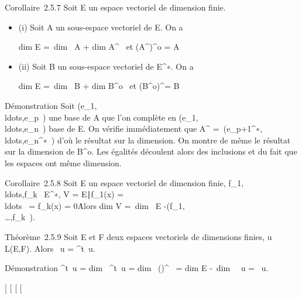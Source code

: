 \documentclass[]{article}
\begin{document}
Corollaire~2.5.7 Soit E un espace vectoriel de dimension finie.

\begin{itemize}
\item
  (i) Soit A un sous-espace vectoriel de E. On a

  dim E =\ dim~ A
  + dim A^\bot~\text
  et (A^\bot)^o = A
\item
  (ii) Soit B un sous-espace vectoriel de E^∗. On a

  dim E =\ dim~ B
  + dim B^o~\text
  et (B^o)^\bot = B
\end{itemize}

Démonstration Soit
(e_1,\\ldots,e_p~)
une base de A que l'on complète en
(e_1,\\ldots,e_n~)
base de E. On vérifie immédiatement que A^\bot
=\
\mathrmVect(e_p+1^∗,\\ldots,e_n^∗~)
d'où le résultat sur la dimension. On montre de même le résultat sur la
dimension de B^o. Les égalités découlent alors des inclusions
et du fait que les espaces ont même dimension.

Corollaire~2.5.8 Soit E un espace vectoriel de dimension finie,
f_1,\\ldots,f_k~
\in E^∗, V = \x \in
E∣f_1(x) =
\\ldots~ =
f_k(x) = 0\. Alors
dim V =\ dim~ E
-\mathrmrg(f_1,\\\ldots,f_k~).

Théorème~2.5.9 Soit E et F deux espaces vectoriels de dimensions finies,
u \in L(E,F). Alors
\mathrmrg~u
= \mathrmrg^t~u.

Démonstration
\mathrmrg^t~u
= dim~
\mathrmIm^t~u
= dim~
(\mathrmKeru)^\bot~
= dim E -\ dim~
\mathrmKer~u
= \mathrmrg~u.

{[}
{[}
{[}
{[}
\end{document}
